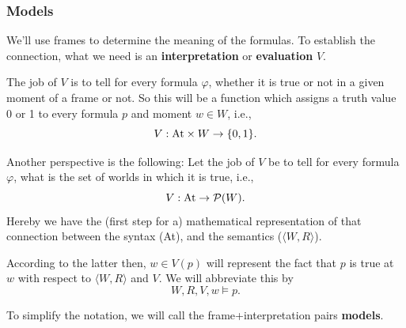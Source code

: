\documentclass[xcolor=x11names]{beamer}
\renewcommand{\emph}[1]{\textbf{#1}}
\begin{document}
\begin{frame}
	\frametitle{Models}
\footnotesize
We'll use frames to determine the meaning of the formulas. To establish the connection, what we need is an \emph{interpretation} or \emph{evaluation} $V$.

\bigskip

The job of $V$ is to tell for every formula $\varphi$, whether it is true or not in a given moment of a frame or not. So this will be a function which assigns a truth value 0 or 1 to every formula $p$ and moment $w\in W$, i.e., \[V: \textup{At}\times W \to \{0,1\}.\]

\bigskip

Another perspective is the following: Let the job of $V$ be to tell for every formula $\varphi$, what is the set of worlds in which it is true, i.e., \[V: \textup{At} \to \mathcal P(W).\] Hereby we have the (first step for a) mathematical representation of that connection between the syntax (\textup{At}), and the semantics ($\langle W, R\rangle$).

\bigskip

According to the latter then, $w\in V(p)$ will represent the fact that $p$ is true at $w$ with respect to $\langle W,R\rangle$ and $V$. We will abbreviate this by \[ W, R, V, w\models p .\]

\bigskip

To simplify the notation, we will call the frame+interpretation pairs \emph{models}.

\end{frame}
\end{document}
